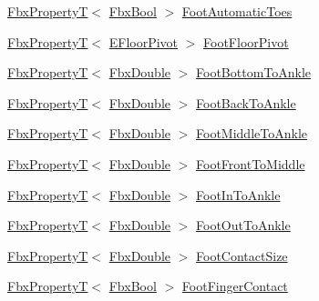 \begin{DoxyCompactItemize}
\item 
\hyperlink{class_fbx_property_t}{Fbx\+PropertyT}$<$ \hyperlink{fbxtypes_8h_a92e0562b2fe33e76a242f498b362262e}{Fbx\+Bool} $>$ \hyperlink{class_fbx_character_ae01ebb9daadf7c434629ebd51c1c1d9b}{Foot\+Automatic\+Toes}
\item 
\hyperlink{class_fbx_property_t}{Fbx\+PropertyT}$<$ \hyperlink{class_fbx_character_a565c1e424493adecfa38e0dcdd17106e}{E\+Floor\+Pivot} $>$ \hyperlink{class_fbx_character_aad2d02ce3b5dfbc7767cdf36267eb8e4}{Foot\+Floor\+Pivot}
\item 
\hyperlink{class_fbx_property_t}{Fbx\+PropertyT}$<$ \hyperlink{fbxtypes_8h_a171e72a1c46fc15c1a6c9c31948c1c5b}{Fbx\+Double} $>$ \hyperlink{class_fbx_character_a8853185ea8fe9870297dcdacce05453c}{Foot\+Bottom\+To\+Ankle}
\item 
\hyperlink{class_fbx_property_t}{Fbx\+PropertyT}$<$ \hyperlink{fbxtypes_8h_a171e72a1c46fc15c1a6c9c31948c1c5b}{Fbx\+Double} $>$ \hyperlink{class_fbx_character_ab102035eb8eb712529296a1fd2afb392}{Foot\+Back\+To\+Ankle}
\item 
\hyperlink{class_fbx_property_t}{Fbx\+PropertyT}$<$ \hyperlink{fbxtypes_8h_a171e72a1c46fc15c1a6c9c31948c1c5b}{Fbx\+Double} $>$ \hyperlink{class_fbx_character_aba466d9e9ca0f585126b3f9712b4d1d0}{Foot\+Middle\+To\+Ankle}
\item 
\hyperlink{class_fbx_property_t}{Fbx\+PropertyT}$<$ \hyperlink{fbxtypes_8h_a171e72a1c46fc15c1a6c9c31948c1c5b}{Fbx\+Double} $>$ \hyperlink{class_fbx_character_a55c8827292a678cf53725d50d594f2ed}{Foot\+Front\+To\+Middle}
\item 
\hyperlink{class_fbx_property_t}{Fbx\+PropertyT}$<$ \hyperlink{fbxtypes_8h_a171e72a1c46fc15c1a6c9c31948c1c5b}{Fbx\+Double} $>$ \hyperlink{class_fbx_character_afcae422eca3e15efe65c5797a78fbf93}{Foot\+In\+To\+Ankle}
\item 
\hyperlink{class_fbx_property_t}{Fbx\+PropertyT}$<$ \hyperlink{fbxtypes_8h_a171e72a1c46fc15c1a6c9c31948c1c5b}{Fbx\+Double} $>$ \hyperlink{class_fbx_character_afd9ef7a16f7b7a80193e67c5e45a6d0b}{Foot\+Out\+To\+Ankle}
\item 
\hyperlink{class_fbx_property_t}{Fbx\+PropertyT}$<$ \hyperlink{fbxtypes_8h_a171e72a1c46fc15c1a6c9c31948c1c5b}{Fbx\+Double} $>$ \hyperlink{class_fbx_character_ada6c47cdcf03d1119afe2c2cc0c92683}{Foot\+Contact\+Size}
\item 
\hyperlink{class_fbx_property_t}{Fbx\+PropertyT}$<$ \hyperlink{fbxtypes_8h_a92e0562b2fe33e76a242f498b362262e}{Fbx\+Bool} $>$ \hyperlink{class_fbx_character_ad07ec037016f94f19f4f8e1168e67399}{Foot\+Finger\+Contact}

\end{DoxyCompactItemize}
